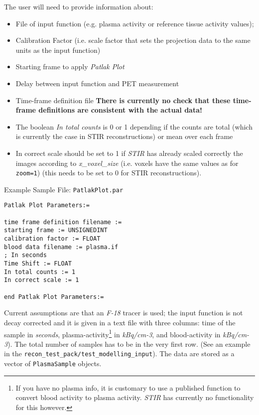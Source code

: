 \documentclass{article}
\begin{document}
The user will need to provide information about:
\begin{itemize} 
\item	File of input function (e.g. plasma activity or reference tissue activity values); 
\item	Calibration Factor (i.e. scale factor that sets the projection data to the same units as the input function)
\item	Starting frame to apply  \textit{Patlak Plot} 
\item	Delay between input function and PET measurement 
\item	Time-frame definition file \textbf{There is currently no check that these time-frame definitions are consistent with the actual data!}
\item	The boolean \textit{In total counts} is 0 or 1 depending if the counts are total (which is currently the case in STIR reconstructions) or mean over each frame
\item	In correct scale should be set to 1 if  \textit{STIR} has already scaled correctly the images according to \textit{x\_voxel\_size} (i.e. voxels have the
   same values as for \texttt{zoom=1}) (this needs to be set to 0 for STIR reconstructions).
\end{itemize}
Example Sample File: \texttt{PatlakPlot.par} 

\begin{verbatim} 
Patlak Plot Parameters:=

time frame definition filename := 
starting frame := UNSIGNEDINT
calibration factor := FLOAT
blood data filename := plasma.if
; In seconds
Time Shift := FLOAT
In total counts := 1
In correct scale := 1

end Patlak Plot Parameters:=
\end{verbatim}

Current assumptions are that an \textit{F-18} tracer is used; the input function is not decay corrected and it
is given in a text file with three columns: time of the sample in \textit{seconds}, plasma-activity\footnote{%
If you have no plasma info, it is customary to use a published function to convert blood activity to plasma activity.
\textit{STIR} has currently no functionality for this however.}
in \textit{kBq/cm-3}, and blood-activity in \textit{kBq/cm-3}). The total number of samples has to be in the very first row.
(See an example in the \texttt{recon\_test\_pack/test\_modelling\_input}). The data are stored as a vector
of \texttt{PlasmaSample} objects.
\end{document}
